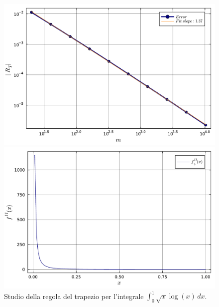 \documentclass[letterpaper, 12pt]{article}
\begin{document}
\begin{figure}[!ht]
    \centering
    \begin{minipage}[b]{0.47\textwidth}
        \includegraphics[width=\textwidth]{5125.pdf}
    \end{minipage}
    \hspace{0.5cm}
    \begin{minipage}[b]{0.47\textwidth}
        \includegraphics[width=\textwidth]{5125_2.pdf}
    \end{minipage}
    \caption{Studio della regola del trapezio per l'integrale $\int_0^1 \sqrt{x} \log(x) \, dx$.}
    \label{fig:es5_1_2_5}
\end{figure}
\end{document}
